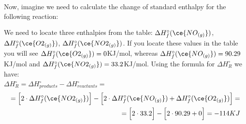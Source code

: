 \documentclass[main.tex]{subfiles}
\begin{document}
\begin{description}
Now, imagine we need to calculate the change of standard enthalpy for the following reaction:
\begin{center}\end{center}
We need to locate three enthalpies from the table: $\Delta H_f^{\circ}(\ce{NO_{(g)}})$, $\Delta H_f^{\circ}(\ce{O2_{(g)}})$, $\Delta H_f^{\circ}(\ce{NO2_{(g)}})$. If you locate these values in the table you will see $\Delta H_f^{\circ}(\ce{O2_{(g)}})=0$KJ/mol, whereas $\Delta H_f^{\circ}(\ce{NO_{(g)}})=90.29$KJ/mol and $\Delta H_f^{\circ}(\ce{NO2_{(g)}})=33.2$KJ/mol. Using the formula for $\Delta H^{\circ}_R$ we have:
\\$ \Delta H^{\circ}_R= \Delta H^{\circ}_{products}-\Delta H^{\circ}_{reactants}=$
\begin{equation*}\begin{split}
  = \Big[2\cdot \Delta H_f^{\circ}(\ce{NO2_{(g)}})    \Big]-\Big[2\cdot \Delta H_f^{\circ}(\ce{NO_{(g)}})+ \Delta H_f^{\circ}(\ce{O2_{(g)}}) \Big] =\\
  =     \Big[2\cdot 33.2  \Big]-\Big[ 2\cdot 90.29+0 \Big]= -114KJ

\end{split}
\end{equation*}
\end{description}
\end{document}
